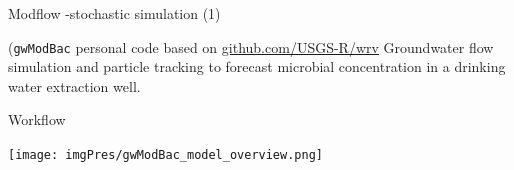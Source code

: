 \documentclass[9pt,ignorenonframetext,]{beamer}
\newcommand{\columnsbegin}{\begin{columns}}
\begin{document}
\begin{frame}[fragile]{Modflow -stochastic simulation (1)}

(\texttt{gwModBac} personal code based on
\href{https://github.com/USGS-R/wrv}{github.com/USGS-R/wrv} Groundwater
flow simulation and particle tracking to forecast microbial
concentration in a drinking water extraction well.

\begin{block}{Workflow}

\texttt{[image: imgPres/gwModBac\_model\_overview.png]}

\end{block}

\end{frame}

\end{document}
